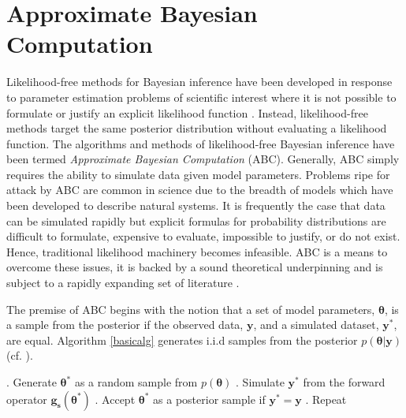 

\pagebreak



\section{Approximate Bayesian Computation}
\label{ApproximateBayesianComputation}

Likelihood-free methods for Bayesian inference have been developed in response to parameter estimation problems of scientific interest where it is not possible to formulate or justify an explicit likelihood function \citet{Tavare1997,Fu1997,Weiss1998a,Pritchard1999a,Beaumont2002,Marjoram2003}. Instead, likelihood-free methods target the same posterior distribution without evaluating a likelihood function. The algorithms and methods of likelihood-free Bayesian inference have been termed \textit{Approximate Bayesian Computation} (ABC). Generally, ABC simply requires the ability to simulate data given model parameters. Problems ripe for attack by ABC are common in science due to the breadth of models which have been developed to describe natural systems. It is frequently the case that data can be simulated rapidly but explicit formulas for probability distributions are difficult to formulate, expensive to evaluate, impossible to justify, or do not exist. Hence, traditional likelihood machinery becomes infeasible. ABC is a means to overcome these issues, it is backed by a sound theoretical underpinning and is subject to a rapidly expanding set of literature \citep{Ratmann2009,Blum2010,vrugt2013toward,Sunnaker2013,Blum2013,Sadegh2014,Pudlo2015,meeds2015hamiltonian,Lintusaari2016,gutmann2016bayesian,sisson2016handbook,Li2017}. \par

The premise of ABC begins with the notion that a set of model parameters, $\bm{\theta}$, is a sample from the posterior if the observed data, $\bm{y}$, and a simulated dataset, $\bm{y^*}$, are equal. Algorithm \ref{basicalg} generates i.i.d samples from the posterior $p(\bm{\theta}|\bm{y})$ (cf. \citet{Marjoram2003}).

\begin{algorithm}[H]
	\caption{ }
	\begin{algorithmic}
		. Generate $\bm{\theta^*}$ as a random sample from $p(\bm{\theta})$		
		. Simulate $\bm{y^*}$ from the forward operator $\bm{g_s}(\bm{\theta^*})$		
		. Accept $\bm{\theta^*}$ as a posterior sample if $\bm{y^*} = \bm{y}$		
		. Repeat
	\end{algorithmic}
	\label{basicalg}
\end{algorithm}

